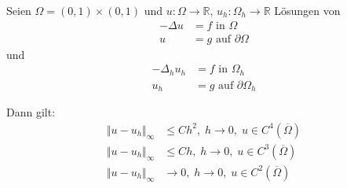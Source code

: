 \begin{satz}[Konvergenz]
Seien $\Omega = (0,1) \times (0,1)$ und $u: \Omega \to \mathbb R$, $u_h: \Omega_h \to \mathbb R$
Lösungen von
\begin{align*}
- \Delta u &= f \text{ in } \Omega \\
u &= g \text{ auf } \partial \Omega
\end{align*}
und
\begin{align*}
- \Delta_h u_h &= f \text{ in } \Omega_h \\
u_h &= g \text{ auf } \partial \Omega_h
\end{align*}

Dann gilt:
\begin{align*}
\Vert u - u_h \Vert_\infty &\leq Ch^2, \; h \to 0, \; u \in C^4( \overline \Omega) \\
\Vert u - u_h \Vert_\infty &\leq Ch, \; h \to 0, \; u \in C^3( \overline \Omega) \\
\Vert u - u_h \Vert_\infty &\to 0, \; h \to 0, \; u \in C^2( \overline \Omega)
\end{align*}
\end{satz}

